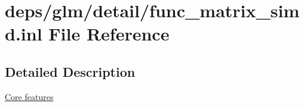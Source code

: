 \hypertarget{func__matrix__simd_8inl}{}\section{deps/glm/detail/func\+\_\+matrix\+\_\+simd.inl File Reference}
\label{func__matrix__simd_8inl}


\subsection{Detailed Description}
\hyperlink{group__core}{Core features} 